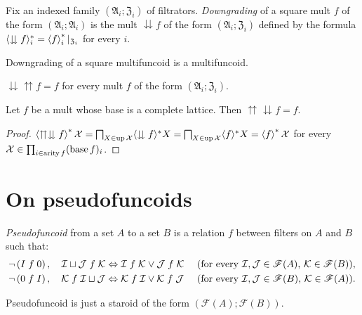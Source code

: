 \begin{defn}
Fix an indexed family $(\mathfrak{A}_{i};\mathfrak{Z}_{i})$ of filtrators.
\emph{Downgrading} of a square mult $f$ of the form $(\mathfrak{A}_{i};\mathfrak{A}_{i})$
is the mult $\downdownarrows f$ of the form $(\mathfrak{A}_{i};\mathfrak{Z}_{i})$
defined by the formula $\langle\downdownarrows f\rangle_{i}^{\ast}=\left\langle f\right\rangle_{i}^{\ast}|_{\mathfrak{Z}_{i}}$
for every $i$.\end{defn}
\begin{obvious}
Downgrading of a square multifuncoid is a multifuncoid.
\end{obvious}

\begin{obvious}
$\downdownarrows\upuparrows f=f$ for every mult $f$ of the form
$(\mathfrak{A}_{i};\mathfrak{Z}_{i})$.\end{obvious}
\begin{prop}
Let $f$ be a mult whose base is a complete lattice. Then $\upuparrows\downdownarrows f=f$.\end{prop}
\begin{proof}
$\left\langle \upuparrows\downdownarrows f\right\rangle ^{\ast}\mathcal{X}=\bigsqcap_{X\in\operatorname{up}\mathcal{X}}\langle\downdownarrows f\rangle^{\ast}X=\bigsqcap_{X\in\operatorname{up}\mathcal{X}}\langle f\rangle^{\ast}X=\left\langle f\right\rangle^{\ast}\mathcal{X}$
for every $\mathcal{X}\in\prod_{i\in\operatorname{arity} f}(\operatorname{base} f)_{i}$.
\end{proof}

\section{On pseudofuncoids}
\begin{defn}
\emph{Pseudofuncoid} from a set $A$ to a set
$B$ is a relation $f$ between filters on $A$ and $B$ such that:
\begin{eqnarray*}
 & \neg\left(I\mathrel{f}0\right),\hspace{1em}\mathcal{I}\sqcup\mathcal{J}\mathrel{f}\mathcal{K}\Leftrightarrow\mathcal{I}\mathrel{f}\mathcal{K}\vee\mathcal{J}\mathrel{f}\mathcal{K}\hspace{1em}\text{ (for every \ensuremath{\mathcal{I},\mathcal{J}\in\mathscr{F}(A)}, \ensuremath{\mathcal{K}\in\mathscr{F}(B)})},\\
 & \neg\left(0\mathrel{f}I\right),\hspace{1em}\mathcal{K}\mathrel{f}\mathcal{I}\sqcup\mathcal{J}\Leftrightarrow\mathcal{K}\mathrel{f}\mathcal{I}\vee\mathcal{K}\mathrel{f}\mathcal{J}\hspace{1em}\text{ (for every \ensuremath{\mathcal{I},\mathcal{J}\in\mathscr{F}(B)}, \ensuremath{\mathcal{K}\in\mathscr{F}(A)})}.
\end{eqnarray*}
\end{defn}
\begin{obvious}
Pseudofuncoid is just a staroid of the form $(\mathscr{F}(A);\mathscr{F}(B))$.
\end{obvious}

